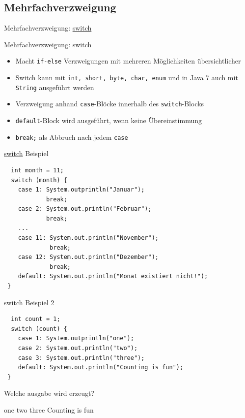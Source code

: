\documentclass[18pt]{beamer}
\begin{document}
\subsection{Mehrfachverzweigung}
\begin{frame}[fragile]{Mehrfachverzweigung: \url{switch}}
  \begin{block}{Mehrfachverzweigung: \url{switch}}
    \begin{itemize}
      \item Macht \lstinline$if-else$ Verzweigungen mit mehreren Möglichkeiten übersichtlicher
      \item Switch kann mit \lstinline$int, short, byte, char, enum$ und in Java 7 auch mit \lstinline$String$ ausgeführt werden
      \item Verzweigung anhand \lstinline$case$-Blöcke innerhalb des \lstinline$switch$-Blocks
      \item \lstinline$default$-Block wird ausgeführt, wenn keine Übereinstimmung
      \item \lstinline$break;$ als Abbruch nach jedem \lstinline$case$
    \end{itemize}
  \end{block}  
\end{frame}

\begin{frame}[fragile]{\url{switch} Beispiel}
 \begin{lstlisting}
  int month = 11;
  switch (month) {
    case 1: System.outprintln("Januar");
            break;
    case 2: System.out.println("Februar");
            break;
    ...
    case 11: System.out.println("November");
             break;
    case 12: System.out.println("Dezember");
             break;
    default: System.out.println("Monat existiert nicht!");
 }
\end{lstlisting}
\end{frame}

\begin{frame}[fragile]{\url{switch} Beispiel 2}
 \begin{lstlisting}
  int count = 1;
  switch (count) {
    case 1: System.outprintln("one");
    case 2: System.out.println("two");
    case 3: System.out.println("three");
    default: System.out.println("Counting is fun");
 }
\end{lstlisting}
\begin{center}
Welche ausgabe wird erzeugt? \newline
\pause
\parbox{10cm}{
one \newline
two \newline
three \newline
Counting is fun}
\end{center}
\end{frame}
\end{document}
